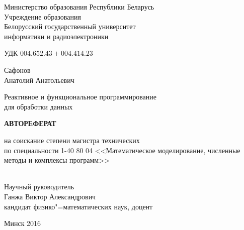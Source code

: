 \begin{titlepage}
  \begin{center}
    Министерство образования Республики Беларусь\\[1em]
    Учреждение образования\\
    Белорусский государственный университет \\
    информатики и радиоэлектроники \\[2em]

    \begin{flushleft}
        УДК $004.652.43+004.414.23$ \\[2cm]
    \end{flushleft}

    \begin{center}
      Сафонов \\ Анатолий Анатольевич\\[3em]
    \end{center}

    {\centering Реактивное и функциональное программирование \\ для обработки данных \\[3em]}


    {\centering\textbf{АВТОРЕФЕРАТ}}\\[2em]

    \begin{center}
      на соискание степени магистра технических \\ по специальности 1-40 80 04 <<Математическое моделирование, численные методы и комплексы программ>>\\[3em]
    \end{center}

    \begin{flushright}
      \underline{\hspace*{7.5cm}} \\[1cm]
      Научный руководитель \\
      Ганжа Виктор Александрович \\
      кандидат физико"=математических наук, доцент \\[1cm]
      \underline{\hspace*{7.5cm}}
    \end{flushright}

    \vfill
    {\normalsize Минск 2016}
  \end{center}
\end{titlepage}
